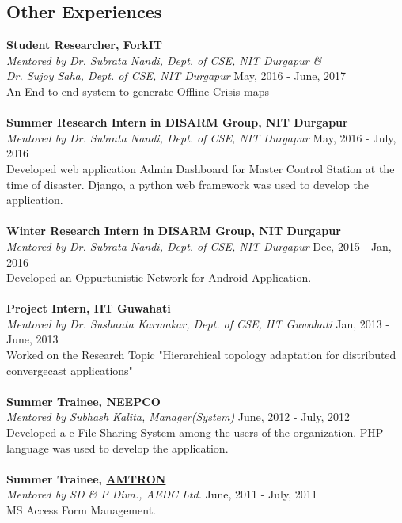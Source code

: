 \documentclass[margin, centered]{res}
\begin{document}
\begin{resume}
\section{Other Experiences}
\textbf{Student Researcher, ForkIT} \\
\emph{Mentored by {Dr. Subrata Nandi, Dept. of CSE, NIT Durgapur} \& \\ {Dr. Sujoy Saha, Dept. of CSE, NIT Durgapur}} \hfill May, 2016 - June, 2017 \\
An End-to-end system to generate Offline Crisis maps \\
\\
\textbf{Summer Research Intern in DISARM Group, NIT Durgapur} \\
\emph{Mentored by {Dr. Subrata Nandi, Dept. of CSE, NIT Durgapur}} \hfill May, 2016 - July, 2016 \\
Developed web application Admin Dashboard for Master Control Station at the time of disaster. Django, a python web framework was used to develop the application.\\
\\
\textbf{Winter Research Intern in DISARM Group, NIT Durgapur} \\
\emph{Mentored by {Dr. Subrata Nandi, Dept. of CSE, NIT Durgapur}} \hfill Dec, 2015 - Jan, 2016 \\
Developed an Oppurtunistic Network for Android Application.
\\
\\
\textbf{Project Intern, IIT Guwahati}  \\
\emph{Mentored by {Dr. Sushanta Karmakar, Dept. of CSE, IIT Guwahati}} \hfill Jan, 2013 - June, 2013 \\
Worked on the Research Topic "Hierarchical topology adaptation for distributed convergecast applications"
\\
\\
\textbf{Summer Trainee, \href{http://neepco.co.in/neepco/}{NEEPCO}} \\
\emph{Mentored by {Subhash Kalita, Manager(System)}} \hfill June, 2012 - July, 2012 \\
Developed a e-File Sharing System among the users of the organization. PHP language was used to develop the application.
\\
\\
\newpage
\textbf{Summer Trainee, \href{http://amtron.in/}{AMTRON}}  \\
\emph{Mentored by {SD \& P Divn., AEDC Ltd.}} \hfill June, 2011 - July, 2011 \\
MS Access Form Management.
\\
\\


\end{resume}
\end{document}
